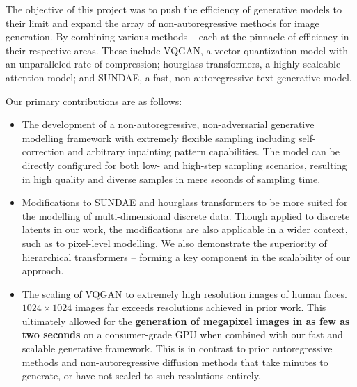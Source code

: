 \documentclass[14pt,margin=0.5in,innermargin=0in,blockverticalspace=-0.1in,colspace=-1.0cm]{tikzposter}
\begin{document}
\begin{columns}
{\begin{tcolorbox}[boxsep=0pt,top=0cm,adjusted title={\Large Proposed Method},colbacktitle=colorOne]
        The objective of this project was to push the efficiency of generative
        models to their limit and expand the array of non-autoregressive methods
        for image generation. By combining various methods -- each at the
        pinnacle of efficiency in their respective areas. These include VQGAN, a
        vector quantization model with an unparalleled rate of compression;
        hourglass transformers, a highly scaleable attention model; and SUNDAE,
        a fast, non-autoregressive text generative model.

        Our primary contributions are as follows:
        \begin{itemize}
            \item
                The development of a non-autoregressive, non-adversarial
                generative modelling framework with extremely flexible sampling
                including self-correction and arbitrary inpainting pattern
                capabilities. The model can be directly configured for both low-
                and high-step sampling scenarios, resulting in high quality and
                diverse samples in mere seconds of sampling time.

            \item
                Modifications to SUNDAE and hourglass transformers to be more
                suited for the modelling of multi-dimensional discrete data. Though
                applied to discrete latents in our work, the modifications are
                also applicable in a wider context, such as to pixel-level
                modelling. We also demonstrate the superiority of hierarchical
                transformers -- forming a key component in the scalability of
                our approach. 
            \item
                The scaling of VQGAN to extremely high resolution images of
                human faces. $1024 \times 1024$ images far exceeds resolutions
                achieved in prior work. This ultimately allowed for the
                \textbf{generation of megapixel images in as few as two seconds}
                on a consumer-grade GPU when combined with our fast and scalable
                generative framework. This is in contrast to prior
                autoregressive methods and non-autoregressive diffusion methods
                that take minutes to generate, or have not scaled to such
                resolutions entirely.

        \end{itemize}
        \end{tcolorbox}
    }


\end{columns}
\end{document}
